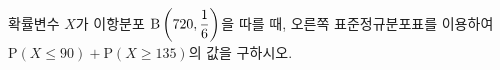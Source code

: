 \noindent\begin{minipage}[t]{0.58\linewidth}\vspace{0pt}\raggedright 확률변수 $X$가 이항분포 $\mathrm{B}\left(720{,}\mkern3mu\mathopen{}\dfrac{1}{6}\right)$을 따를 때, 오른쪽 표준정규분포표를 이용하여 $\mathrm{P}(X\le 90)+\mathrm{P}(X\ge 135)$의 값을 구하시오.\end{minipage}\hfill\begin{minipage}[t]{0.4\linewidth}\vspace{0pt}\centering \resizebox{\ifdim\width>\linewidth\linewidth\else\width\fi}{!}{}\end{minipage}\par
